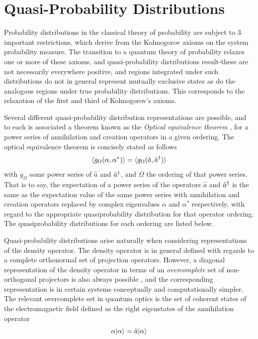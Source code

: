 \section{Quasi-Probability Distributions}
Probability distributions in the classical theory of probability are subject to 3 important restrictions, which derive from the Kolmogorov axioms on the system probability measure. The transition to a quantum theory of probability relaxes one or more of these axioms, and quasi-probability distributions result-these are not necessarily everywhere positive, and regions integrated under such distributions do not in general represent mutually exclusive states as do the analogous regions under true probability distributions. This corresponds to the relaxation of the first and third of Kolmogorov's axioms.

Several different quasi-probability distribution representations are possible\autocite{Walls2008}, and to each is associated a theorem known as the \emph{Optical equivalence theorem} \autocite{Sudarshan1963}, for a power series of annihilation and creation operators in a given ordering. The optical equivalence theorem is concisely stated as follows
\begin{equation}
	\langle g_{\Omega} (\alpha, \alpha^*) \rangle = \langle g_{\Omega} (\hat{a}, \hat{a}^\dagger) \rangle
\end{equation}
with $g_\Omega$ some power series of $\hat{a}$ and $\hat{a}^\dagger$, and $\Omega$ the ordering of that power series. That is to say, the expectation of a power series of the operators $\hat{a}$ and $\hat{a}^\dagger$ is the same as the expectation value of the same power series with annihilation and creation operators replaced by complex eigenvalues $\alpha$ and $\alpha^*$ respectively, with regard to the appropriate quasiprobability distribution for that operator ordering. The quasiprobability distributions for each ordering are listed below.

Quasi-probability distributions arise naturally when considering representations of the density operator. The density operator is in general defined with regards to a complete orthonormal set of projection operators. However, a diagonal representation of the density operator in terms of an \emph{overcomplete} set of non-orthogonal projectors is also always possible \autocite{Sudarshan1963}, and the corresponding representation is in certain systems conceptually and computationally simpler. The relevant overcomplete set in quantum optics is the set of coherent states of the electromagnetic field defined as the right eigenstates of the annihilation operator
\begin{equation}
\alpha | \alpha \rangle = \hat{a} | \alpha \rangle
\end{equation}
